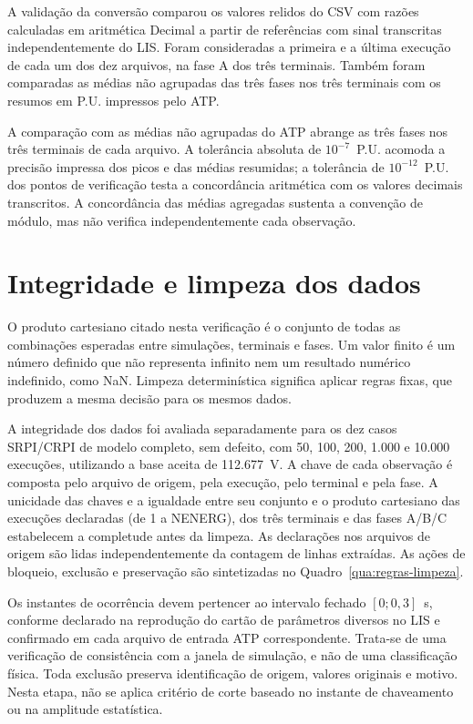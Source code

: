 \documentclass[
	12pt,				%
	openright,			%
	oneside,			%
	a4paper,			%
	chapter=TITLE,		%
	section=TITLE,		%
	subsection=TITLE,	%
	subsubsection=TITLE,%
	english,			%
	brazilian			%
	]{abntex2}
\theoremstyle{definition}
\begin{document}
A validação da conversão comparou os valores relidos do CSV com razões
calculadas em aritmética Decimal a partir de referências com sinal
transcritas independentemente do LIS. Foram consideradas a primeira e a última
execução de cada um dos dez arquivos, na fase A dos três terminais. Também
foram comparadas as médias não agrupadas das três fases nos três terminais
com os resumos em P.U. impressos pelo ATP.

A comparação com as médias não agrupadas do ATP abrange as três fases nos
três terminais de cada arquivo. A tolerância absoluta de $10^{-7}$~P.U.
acomoda a precisão impressa dos picos e das médias resumidas; a tolerância de
$10^{-12}$~P.U. dos pontos de verificação testa a concordância aritmética com
os valores decimais transcritos. A concordância das médias agregadas sustenta
a convenção de módulo, mas não verifica independentemente cada observação.

\section{Integridade e limpeza dos dados}
\label{sec:data-cleaning-validation}

O produto cartesiano citado nesta verificação é o conjunto de todas as
combinações esperadas entre simulações, terminais e fases. Um valor finito
é um número definido que não representa infinito nem um resultado
numérico indefinido, como NaN. Limpeza determinística significa aplicar
regras fixas, que produzem a mesma decisão para os mesmos dados.

A integridade dos dados foi avaliada separadamente
para os dez casos SRPI/CRPI de modelo completo, sem defeito, com 50, 100, 200,
1.000 e 10.000 execuções, utilizando a base aceita de 112.677~V. A chave de cada
observação é composta pelo arquivo de origem, pela execução, pelo terminal e
pela fase. A unicidade das chaves e a igualdade entre seu conjunto e o produto
cartesiano das execuções declaradas (de 1 a NENERG), dos três terminais e das
fases A/B/C estabelecem a completude antes da limpeza. As declarações nos
arquivos de origem são lidas independentemente da contagem de linhas extraídas.
As ações de bloqueio, exclusão e preservação são sintetizadas no
Quadro~\ref{qua:regras-limpeza}.

Os instantes de ocorrência devem pertencer ao intervalo fechado $[0;0{,}3]$~s,
conforme declarado na reprodução do cartão de parâmetros diversos no LIS e
confirmado em cada arquivo de entrada ATP correspondente. Trata-se de uma
verificação de consistência com a janela de simulação, e não de uma
classificação física. Toda exclusão preserva identificação de origem,
valores originais e motivo. Nesta etapa, não se aplica critério de corte
baseado no instante de chaveamento ou na amplitude estatística.
\end{document}
